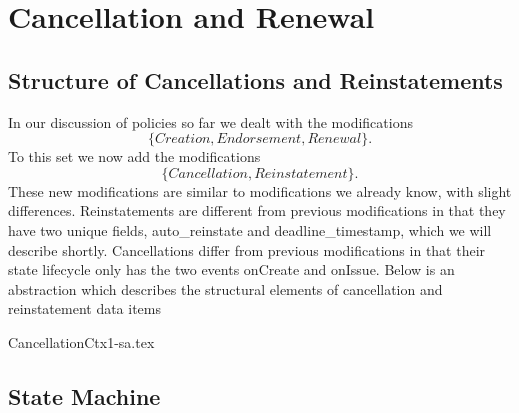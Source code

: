 \chapter{Cancellation and Renewal}
\label{intro} %


\section{Structure of Cancellations and Reinstatements}
\label{sec:02:1}
In our discussion of policies so far we dealt with the modifications
\begin{equation*}
  \{Creation, Endorsement, Renewal\}.
\end{equation*}
To this set we now
add the modifications
\begin{equation*}
  \{Cancellation, Reinstatement\}.
\end{equation*}
These new modifications are similar to modifications we already
know, with slight differences. Reinstatements are different from previous modifications in that they have two unique
fields, auto\_reinstate and deadline\_timestamp, which we will describe shortly. Cancellations differ from previous
modifications in that their state lifecycle only has the two events onCreate and onIssue. Below is an abstraction which
describes the structural elements of cancellation and reinstatement data items

{CancellationCtx1-sa.tex}

\section{State Machine}

